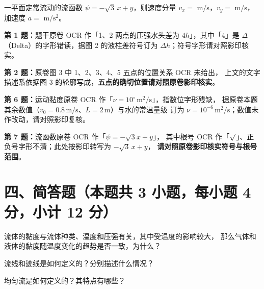 \begin{ti}
  \item 一平面定常流动的流函数 $\psi=-\sqrt{3}\,x+y$，则速度分量
  $v_x=$ \underline{\hspace{2cm}} $\mathrm{m/s}$，$v_y=$ \underline{\hspace{2cm}} $\mathrm{m/s}$，
  加速度 $a=$ \underline{\hspace{2cm}} $\mathrm{m/s^2}$。\hfill{}
\end{ti}

\begin{tishi}
\textbf{第 1 题：}题干原卷 OCR 作「1、2 两点的压强水头差为 $4h$」，其中「$4$」是
$\Delta$（Delta）的字形错读，据图 2 的液柱差符号订为 $\Delta h$；符号字形请对照影印核实。

\textbf{第 2 题：}原卷图 3 中 1、2、3、4、5 五点的位置关系 OCR 未给出，
上文的文字描述系依据图 3 的轮廓写成，\textbf{五点的确切位置请对照原卷影印核实}。

\textbf{第 6 题：}运动黏度原卷 OCR 作「$\nu=10^{\circ}\,\mathrm{m^2/s}$」，指数位字形残缺，
据原卷本题其余数值（$v_0=0.8\,\mathrm{m/s}$、$L=2\,\mathrm{m}$）与水的常温量级
订为 $\nu=10^{-6}\,\mathrm{m^2/s}$；数值未作改动，请对照影印复核。

\textbf{第 7 题：}流函数原卷 OCR 作「$\psi=-\sqrt{3}x+y$」，
其中根号 OCR 作「$\surd$」、正负号字形不清；此处按影印转写为 $-\sqrt{3}\,x+y$，
\textbf{请对照原卷影印核实符号与根号范围}。
\end{tishi}

\section{四、简答题（本题共 3 小题，每小题 4 分，小计 12 分）}

\begin{ti}
  \item 流体的黏度与流体种类、温度和压强有关，其中受温度的影响较大，
  那么气体和液体的黏度随温度变化的趋势是否一致，为什么？\hfill{}

  \item 流线和迹线是如何定义的？分别描述什么情况？\hfill{}

  \item 均匀流是如何定义的？其特点有哪些？\hfill{}
\end{ti}

